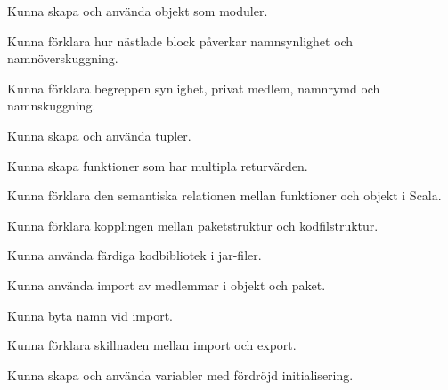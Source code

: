 
\item Kunna skapa och använda objekt som moduler.
\item Kunna förklara hur nästlade block påverkar namnsynlighet och namnöverskuggning.
\item Kunna förklara begreppen synlighet, privat medlem, namnrymd och namnskuggning.

\item Kunna skapa och använda tupler.
\item Kunna skapa funktioner som har multipla returvärden.
\item Kunna förklara den semantiska relationen mellan funktioner och objekt i Scala.

\item Kunna förklara kopplingen mellan paketstruktur och kodfilstruktur.
\item Kunna använda färdiga kodbibliotek i jar-filer.

\item Kunna använda import av medlemmar i objekt och paket.
\item Kunna byta namn vid import.
\item Kunna förklara skillnaden mellan import och export.

\item Kunna skapa och använda variabler med fördröjd initialisering.
